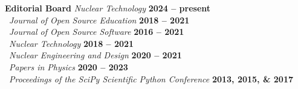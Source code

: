 \documentclass[margin,line]{resume}
\begin{document}
\begin{resume}
    \textbf{Editorial Board} \hfill \emph{Nuclear Technology} \textbf{2024 -- present}\vspace{2mm}\\%
                    \mbox{}~\hfill \emph{Journal of Open Source Education} \textbf{2018 -- 2021}\\%
                    \mbox{}~\hfill \emph{Journal of Open Source Software} \textbf{2016 -- 2021}\\%
                    \mbox{}~\hfill \emph{Nuclear Technology} \textbf{2018 -- 2021}\vspace{2mm}\\%
                    \mbox{}~\hfill \emph{Nuclear Engineering and Design} \textbf{2020 -- 2021}\vspace{2mm}\\%
                    \mbox{}~\hfill \emph{Papers in Physics} \textbf{2020 -- 2023}\vspace{2mm}\\%
                    \mbox{}~\hfill \emph{Proceedings of the SciPy Scientific Python Conference} \textbf{2013, 2015, \& 2017}\vspace{2mm}\\%
  

\end{resume}
\end{document}
